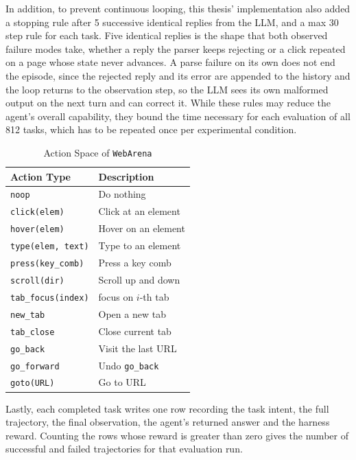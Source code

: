 In addition, to prevent continuous looping, this thesis' implementation also
added a stopping rule after 5 successive identical replies from the LLM, and a
max 30 step rule for each task. Five identical replies is the shape that both
observed failure modes take, whether a reply the parser keeps rejecting or a
click repeated on a page whose state never advances. A parse failure on its own
does not end the episode, since the rejected reply and its error are appended to
the history and the loop returns to the observation step, so the LLM sees its
own malformed output on the next turn and can correct it.
While these rules may reduce the agent's overall capability, they bound the time
necessary for each evaluation of all 812 tasks, which has to be repeated once
per experimental condition.

\begin{table}[t]
\centering
\begin{tabular}{l|l}
\hline
\textbf{Action Type} & \textbf{Description} \\
\hline
\texttt{noop} & Do nothing \\
\texttt{click(elem)} & Click at an element \\
\texttt{hover(elem)} & Hover on an element \\
\texttt{type(elem, text)} & Type to an element \\
\texttt{press(key\_comb)} & Press a key comb \\
\texttt{scroll(dir)} & Scroll up and down \\
\hline
\texttt{tab\_focus(index)} & focus on $i$-th tab \\
\texttt{new\_tab} & Open a new tab \\
\texttt{tab\_close} & Close current tab \\
\hline
\texttt{go\_back} & Visit the last URL \\
\texttt{go\_forward} & Undo \texttt{go\_back} \\
\texttt{goto(URL)} & Go to URL \\
\hline
\end{tabular}
\caption{Action Space of \texttt{WebArena}}
\label{tab:webarena_action_space}
\end{table}

Lastly, each completed task writes one row recording the task intent, the full
trajectory, the final observation, the agent's returned answer and the harness
reward. Counting the rows whose reward is greater than zero gives the number of successful and failed trajectories for that evaluation run.

